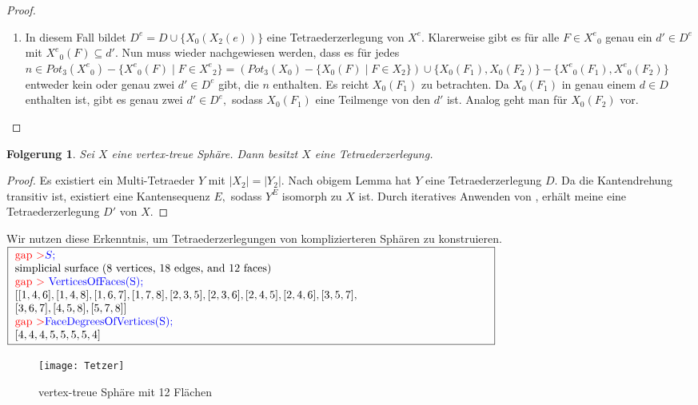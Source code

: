 \documentclass[12pt,titlepage,twoside,cleardoublepage]{article}
\theoremstyle{nummermitklammern}
\newtheorem{folgerung}[temp]{Folgerung}
\newtheorem{bsp}[temp]{Beispiel}
\newtheorem{folgerung}[zahl]{Folgerung}
\newtheorem{bsp}[zahl]{Beispiel}
\numberwithin{equation}{section}
\begin{document}
\begin{proof}
\begin{enumerate}
\item In diesem Fall bildet $D^e=D\cup\{X_0(X_2(e))\}$ eine Tetraederzerlegung von $X^e.$ Klarerweise gibt es für alle $F\in {X^e}_0$ genau ein $d'\in D^e$ mit ${X^e}_0(F)\subseteq d'.$ Nun muss wieder nachgewiesen werden, dass es für jedes $n\in Pot_3({X^e}_0)-\{{X^e}_0(F)\mid F\in {X^e}_2\}=(Pot_3({X}_0)-\{{X}_0(F)\mid F\in {X}_2\})\cup \{X_0(F_1),X_0(F_2)\}-\{{X^e}_0(F_1),{X^e}_0(F_2)\}$ entweder kein oder genau zwei $d'\in D^e$ gibt, die $n$ enthalten. Es reicht $X_0(F_1)$ zu betrachten. Da $X_0(F_1)$ in genau einem $d\in D$ enthalten ist, gibt es genau zwei $d'\in D^e,$ sodass $X_0(F_1)$ eine Teilmenge von den $d'$ ist. Analog geht man für $X_0(F_2) $ vor.
\end{enumerate}
\end{proof}
\begin{folgerung}
Sei $X$ eine vertex-treue Sphäre. Dann besitzt $X$ eine Tetraederzerlegung.
\end{folgerung}
\begin{proof}
Es existiert ein Multi-Tetraeder $Y$ mit $\vert X_2\vert =\vert Y_2 \vert .$ Nach obigem Lemma hat $Y$ eine Tetraederzerlegung $D$. Da die Kantendrehung transitiv ist, existiert eine Kantensequenz $E,$ sodass $Y^E$ isomorph zu $X$ ist. Durch iteratives Anwenden von , erhält meine eine Tetraederzerlegung $D'$ von $X$. 
\end{proof}
Wir nutzen diese Erkenntnis, um Tetraederzerlegungen von komplizierteren Sphären zu konstruieren.\newline
$\fbox{
\parbox{15cm}{
\textcolor{red}{gap $>$}\textcolor{blue}{$S;$}\\
simplicial surface (8 vertices, 18 edges, and 12 faces)\\
\textcolor{red}{gap $>$} \textcolor{blue}{VerticesOfFaces(S);}\\
$[ [ 1, 4, 6 ], [ 1, 4, 8 ], [ 1, 6, 7 ], [ 1, 7, 8 ], [ 2, 3, 5 ],
[ 2, 3, 6 ], [ 2, 4, 5 ], [ 2, 4, 6 ], [ 3, 5, 7 ],$\newline
$ [ 3, 6, 7 ],
[ 4, 5, 8 ], [ 5, 7, 8 ] ]$\newline
\textcolor{red}{gap $>$}\textcolor{blue}{ FaceDegreesOfVertices(S);}\\
$[ 4, 4, 4, 5, 5, 5, 5, 4 ]$
 }}$\\
 \begin{figure}[H]
\begin{center}
\texttt{[image: Tetzer]}
\end{center}
\caption{vertex-treue Sphäre mit 12 Flächen}
\end{figure}
\end{document}
